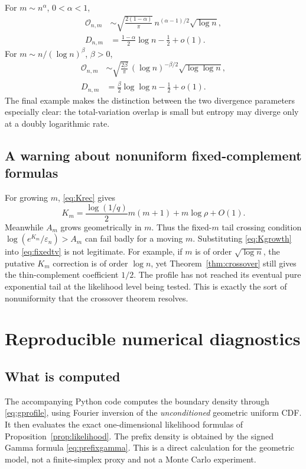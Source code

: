 \documentclass[11pt,a4paper]{article}
\numberwithin{equation}{section}
\theoremstyle{definition}
\theoremstyle{remark}
\newcommand{\eps}{\varepsilon}
\newcommand{\ov}{\mathcal O}
\begin{document}
For $m\sim n^\alpha$, $0<\alpha<1$,
\begin{align*}
\ov_{n,m}&\sim\sqrt{\frac{2(1-\alpha)}\pi}\,
             n^{(\alpha-1)/2}\sqrt{\log n},\\
D_{n,m}&=\frac{1-\alpha}{2}\log n-\frac12+o(1).
\end{align*}
For $m\sim n/(\log n)^\beta$, $\beta>0$,
\begin{align*}
\ov_{n,m}&\sim\sqrt{\frac{2\beta}\pi}\,
            (\log n)^{-\beta/2}\sqrt{\log\log n},\\
D_{n,m}&=\frac\beta2\log\log n-\frac12+o(1).
\end{align*}
The final example makes the distinction between the two divergence
parameters especially clear: the total-variation overlap is small but
entropy may diverge only at a doubly logarithmic rate.

\subsection{A warning about nonuniform fixed-complement formulas}
For growing $m$, \eqref{eq:Krec} gives
\begin{equation}\label{eq:Kgrowth}
K_m=\frac{\log(1/q)}2m(m+1)+m\log\rho+O(1).
\end{equation}
Meanwhile $A_m$ grows geometrically in $m$. Thus the fixed-$m$ tail
crossing condition $\log(e^{K_m}/\eps_n)>A_m$ can fail badly for a
moving $m$. Substituting \eqref{eq:Kgrowth} into \eqref{eq:fixedtv} is
not legitimate. For example, if $m$ is of order $\sqrt{\log n}$, the
putative $K_m$ correction is of order $\log n$, yet
Theorem~\ref{thm:crossover} still gives the thin-complement coefficient
$1/2$. The profile has not reached its eventual pure exponential tail
at the likelihood level being tested. This is exactly the sort of
nonuniformity that the crossover theorem resolves.

\section{Reproducible numerical diagnostics}
\label{sec:numerics}

\subsection{What is computed}
The accompanying Python code computes the boundary density through
\eqref{eq:gprofile}, using Fourier inversion of the \emph{unconditioned}
geometric uniform CDF. It then evaluates the exact one-dimensional
likelihood formulas of Proposition~\ref{prop:likelihood}. The prefix
density is obtained by the signed Gamma formula
\eqref{eq:prefixgamma}. This is a direct calculation for the geometric
model, not a finite-simplex proxy and not a Monte Carlo experiment.
\end{document}
